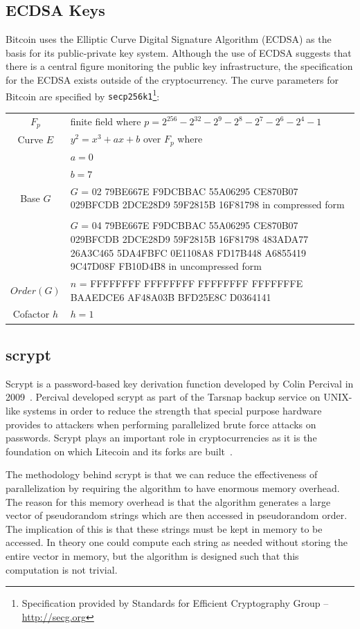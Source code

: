 \documentclass[11pt]{article}
\begin{document}
\subsection{ECDSA Keys}
Bitcoin uses the Elliptic Curve Digital Signature Algorithm (ECDSA) as the basis for its
public-private key system. Although the use of ECDSA suggests that there is a
central figure monitoring the public key infrastructure, the specification for
the ECDSA exists outside of the cryptocurrency. The curve parameters for Bitcoin
are specified by {\tt secp256k1}\footnote{Specification provided by Standards
for Efficient Cryptography Group -- \url{http://secg.org}}:
\vspace{1em}\\
\begin{tabularx}{\textwidth}{cX}
    $F_p$ & finite field where
        $p = 2^{256} - 2^{32} - 2^9 - 2^8 - 2^7 - 2^6 - 2^4 - 1$\\
    Curve $E$ & $y^2 = x^3 + ax + b$ over $F_p$ where\\
    & $a = 0$\\
    & $b = 7$\\
    Base $G$ & $G$ = 02 79BE667E F9DCBBAC 55A06295 CE870B07 029BFCDB 2DCE28D9
        59F2815B 16F81798 in compressed form\\
    & \\
             & $G$ = 04 79BE667E F9DCBBAC 55A06295 CE870B07 029BFCDB 2DCE28D9 59F2815B 16F81798 483ADA77 26A3C465 5DA4FBFC 0E1108A8 FD17B448 A6855419 9C47D08F FB10D4B8 in uncompressed form\\
    $Order(G)$ & $n$ = FFFFFFFF FFFFFFFF FFFFFFFF FFFFFFFE BAAEDCE6 AF48A03B
        BFD25E8C D0364141\\
    Cofactor $h$ & $h = 1$
\end{tabularx}

\subsection{scrypt}
Scrypt is a password-based key derivation function developed by Colin Percival
in 2009~\cite{percival09}. Percival developed scrypt as part of the Tarsnap
backup service on UNIX-like systems in order to reduce the strength that
special purpose hardware provides to attackers when performing parallelized
brute force attacks on passwords. Scrypt plays an important role in
cryptocurrencies as it is the foundation on which Litecoin and its forks are
built~\cite{sprankel13}.

The methodology behind scrypt is that we can
reduce the effectiveness of parallelization by requiring the algorithm to have
enormous memory overhead. The reason for this memory overhead is that the
algorithm generates a large vector of pseudorandom strings which are then
accessed in pseudorandom order. The implication of this is that these strings
must be kept in memory to be accessed. In theory one could compute each string
as needed without storing the entire vector in memory, but the algorithm is
designed such that this computation is not trivial.
\end{document}
